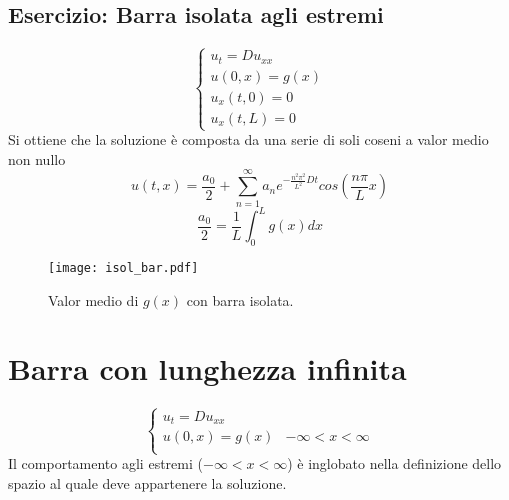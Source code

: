 \subsection{Esercizio: Barra isolata agli estremi}
\[
	\left\{
	\begin{array}{l}
		u_t=Du_{xx} \\
		u(0,x)=g(x) \\
		u_x(t,0)=0 \\
		u_x(t,L)=0
	\end{array}
	\right.
\]
Si ottiene che la soluzione \`e composta da una serie di soli coseni a 
valor medio non nullo
\[
	u(t,x)= \frac{a_0}{2}+ \sum_{n=1}^\infty a_n 
	e^{-\frac{n^2\pi^2}{L^2} Dt}
	cos \left(\frac{n\pi}{L}x \right)
\]
\[
	\frac{a_0}{2}= \frac{1}{L}\int_0^L g(x)dx
\]
\begin{figure}[H]
	\centering
	\texttt{[image: isol\_bar.pdf]}
	\caption{Valor medio di $g(x)$ con barra isolata.}
	\label{isol_bar}
\end{figure}
\section{Barra con lunghezza infinita}
\[
	\left\{
	\begin{array}{ll}
		u_t=Du_{xx} \\
		u(0,x)=g(x) & -\infty < x < \infty \\
	\end{array}
	\right.
\]
Il comportamento agli estremi ($-\infty < x < \infty$) \`e inglobato nella definizione dello spazio al quale deve appartenere la soluzione.
